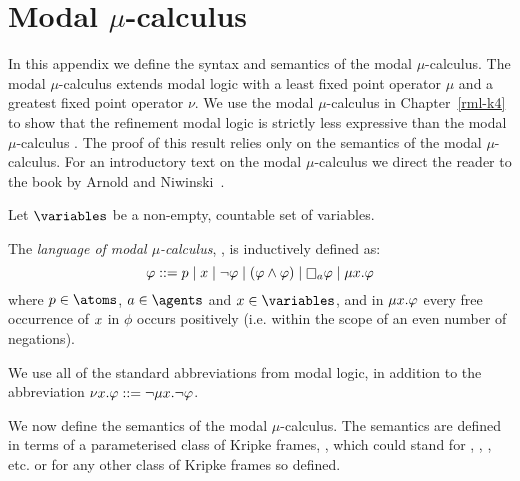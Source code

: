 \chapter{Modal $\mu$-calculus}\label{mu}

In this appendix we define the syntax and semantics of the modal $\mu$-calculus.
The modal $\mu$-calculus extends modal logic with a least fixed point operator $\mu$ and a greatest fixed point operator $\nu$.
We use the modal $\mu$-calculus in Chapter~\ref{rml-k4} to show that the refinement modal logic \logicRmlKF{} is strictly less expressive than the modal $\mu$-calculus \logicMuKF{}.
The proof of this result relies only on the semantics of the modal $\mu$-calculus.
For an introductory text on the modal $\mu$-calculus we direct the reader to the book by Arnold and Niwinski~\cite{arnold:2001}.

Let $\variables$ be a non-empty, countable set of variables.

\begin{definition}
The {\em language of modal $\mu$-calculus}, \langMu{}, is inductively defined as:
$$
\phi ::= 
    \atomP \mid
    \varX \mid
    \lnot \phi \mid
    (\phi \land \phi) \mid
    \necessaryA \phi \mid
    \lfpX \phi
$$
where $\atomP \in \atoms$, $\agentA \in \agents$ and $\varX \in \variables$, and in $\mu {x} . \varphi$ every free occurrence of $x$ in $\phi$ occurs positively (i.e. within the scope of an even number of negations).
\end{definition}

We use all of the standard abbreviations from modal logic, in addition to the abbreviation $\nu {x} . \varphi ::= \lnot \mu {x} . \lnot \varphi$.

We now define the semantics of the modal $\mu$-calculus.
The semantics are defined in terms of a parameterised class of Kripke frames, \classC{}, which could stand for \classK{}, \classKF{}, \classKFF{}, etc. or for any other class of Kripke frames so defined.

